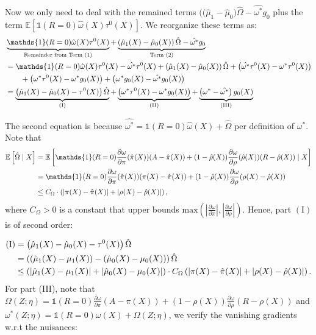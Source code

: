 \documentclass{article}
\theoremstyle{plain}
\theoremstyle{definition}
\theoremstyle{remark}
\newcommand{\E}{\mathbb{E}}                %
\newcommand{\1}{\mathds{1}}                %
\begin{document}
Now we only need to deal with the remained terms $\big( (\hat\mu_1-\hat\mu_0\big) \hat{\Omega} - \hat{\omega^*}g_0$ plus the term $\E\left[ \1(R=0) \hat{\omega}(X) \tau^0(X) \right]$. We reorganize these terms as:
\begin{align}
\label{eq:remain-decompose}
&\underbrace{\1(R=0)\hat\omega(X)\tau^0(X)}_{\text{Remainder from Term (1)}} + \underbrace{\left(\hat\mu_1(X)-\hat\mu_0(X)\right)\hat\Omega - \hat{\omega^*}g_0}_{\text{Term (2)}} \notag \\
    &=\1(R=0)\hat\omega(X)\tau^0(X) - \hat{\omega^*}\tau^0(X) + \left(\hat\mu_1(X)-\hat\mu_0(X)\right)\hat\Omega +  \left(\hat{\omega^*}\tau^0(X)- \omega^*\tau^0(X)\right)\\
    & \qquad + \left(\omega^*\tau^0(X) - \omega^*g_0(X)\right) + \left(\omega^*g_0(X) - \hat{\omega^*}g_0(X)\right) \notag \\
    &= \underbrace{\left(\hat\mu_1(X)-\hat\mu_0(X) - \tau^0(X)\right)\hat\Omega}_{(\text{I})} + \underbrace{\left(\omega^*\tau^0(X) - \omega^*g_0(X)\right)}_{(\text{II})} + \underbrace{\left(\omega^* - \hat{\omega^*}\right)g_0(X)}_{(\text{III})}
\end{align}

The second equation is because $\hat{\omega^*} = \1(R=0)\hat\omega(X) + \hat\Omega$ per definition of $\omega^*$.
Note that
\begin{align}
     \E\left[\hat\Omega \mid X\right] &= \E\left[\1(R=0) \frac{\partial \omega}{\partial \pi}(\hat\pi(X)) (A - \hat\pi(X)) + (1-\hat\rho(X)) \frac{\partial \omega}{\partial \rho}(\hat\rho(X)) (R - \hat\rho(X)) \mid X\right] \notag \\
     &=\1(R=0) \frac{\partial \omega}{\partial \pi}(\hat\pi(X)) (\pi(X) - \hat\pi(X)) + (1-\hat\rho(X)) \frac{\partial \omega}{\partial\rho} (\rho(X) - \hat\rho(X)) \notag \\
     & \leq C_\Omega \cdot \left(|\pi(X) - \hat\pi(X)| + |\rho(X) - \hat\rho(X)|\right),
\end{align}
where $C_\Omega>0$ is a constant that upper bounds $\text{max}( |\frac{\partial \omega}{\partial \pi}|, |\frac{\partial \omega}{\partial \rho}|)$.
Hence, part $(\text{I})$ is of second order:

\begin{align} 
\label{part-I} 
(\text{I}) & = \left(\hat\mu_1(X)-\hat\mu_0(X) - \tau^0(X)\right)\hat\Omega \notag \\ 
& = \left( (\hat\mu_1(X) - \mu_1(X)) - (\hat\mu_0(X) - \mu_0(X)) \right) \hat{\Omega} \notag \\ 
& \leq \left( |\hat\mu_1(X) - \mu_1(X)| + |\hat\mu_0(X) - \mu_0(X)| \right) 
\cdot C_\Omega \left(|\pi(X) - \hat\pi(X)| + |\rho(X) - \hat\rho(X)|\right). \end{align}
For part (III), note that $ \Omega(Z;\eta)=\1(R=0) \frac{\partial \omega}{\partial \pi} (A - \pi(X)) + (1-\rho(X)) \frac{\partial \omega}{\partial \rho} (R - \rho(X))$ and $\omega^*(Z;\eta)=\1(R=0)\omega(X)+ \Omega(Z;\eta)$, we verify the vanishing gradients w.r.t the nuisances: 
\end{document}
